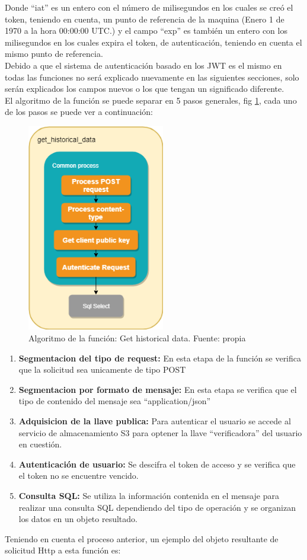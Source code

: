 Donde ``iat'' es un entero con el número de milisegundos en los cuales se creó el token, teniendo en cuenta, un punto de referencia de la maquina (Enero 1 de 1970 a la hora 00:00:00 UTC.) y el campo ``exp'' es también un entero con los milisegundos en los cuales expira el token, de autenticación, teniendo en cuenta el mismo punto de referencia.
\vspace{0.5cm}\\
Debido a que el sistema de autenticación basado en los JWT es el mismo en todas las funciones no será explicado nuevamente en las siguientes secciones, solo serán explicados los campos nuevos o los que tengan un significado diferente.
\vspace{0.5cm}\\
El algoritmo de la función se puede separar en 5 pasos generales, fig \ref{fig_28}, cada uno de los pasos se puede ver a continuación:
\begin{figure}[htbp]
	\centerline{\includegraphics[width=6cm]{figuras/algoritmo_get_historical.png}}
	\caption{Algoritmo de la función: Get historical data. Fuente: propia}
	\label{fig_28}
\end{figure}
\begin{enumerate}
	\item \textbf{Segmentacion del tipo de request:} En esta etapa de la función se verifica que la solicitud sea unicamente de tipo POST
	\item \textbf{Segmentacion por formato de mensaje:} En esta etapa se verifica que el tipo de contenido del mensaje sea ``application/json''
	\item \textbf{Adquisicion de la llave publica:} Para autenticar el usuario se accede al servicio de almacenamiento S3 para optener la llave ``verificadora'' del usuario en cuestión.
	\item \textbf{Autenticación de usuario:} Se descifra el token de acceso y se verifica que el token no se encuentre vencido.
	\item \textbf{Consulta SQL:} Se utiliza la información contenida en el mensaje para realizar una consulta SQL dependiendo del tipo de operación y se organizan los datos en un objeto resultado.
\end{enumerate}
Teniendo en cuenta el proceso anterior, un ejemplo del objeto resultante de solicitud Http a esta función es:

